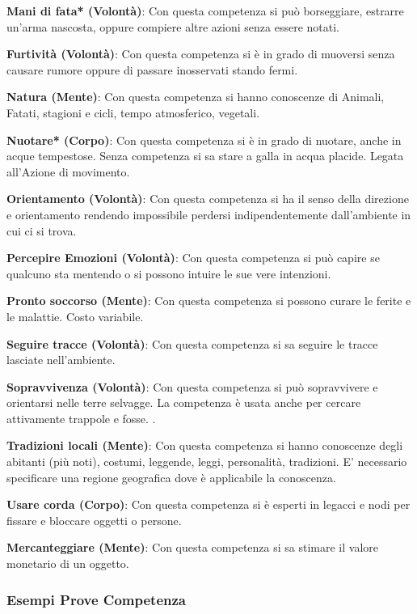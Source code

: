 \documentclass[12pt,a4paper,twoside,openany]{book}
\begin{document}
\begin{multicols}{2}
\textbf{Mani di fata* (Volontà)}: Con questa competenza si può borseggiare, estrarre un'arma nascosta, oppure compiere altre azioni senza essere notati. 

\textbf{Furtività (Volontà)}: Con questa competenza si è in grado di muoversi senza causare rumore oppure di passare inosservati stando fermi. 

\textbf{Natura (Mente)}: Con questa competenza si hanno conoscenze di Animali, Fatati, stagioni e cicli, tempo atmosferico, vegetali. 

\textbf{Nuotare* (Corpo)}: Con questa competenza si è in grado di nuotare, anche in acque tempestose. Senza competenza si sa stare a galla in acqua placide. Legata all'Azione di movimento.

\textbf{Orientamento (Volontà)}: Con questa competenza si ha il senso della direzione e orientamento rendendo impossibile perdersi indipendentemente dall'ambiente in cui ci si trova. 

\textbf{Percepire Emozioni (Volontà)}: Con questa competenza si può capire se qualcuno sta mentendo o si possono intuire le sue vere intenzioni.

\textbf{Pronto soccorso (Mente)}: Con questa competenza si possono curare le ferite e le malattie. Costo variabile.

\textbf{Seguire tracce (Volontà)}: Con questa competenza si sa seguire le tracce lasciate nell'ambiente. 

\textbf{Sopravvivenza (Volontà)}: Con questa competenza si può sopravvivere e orientarsi nelle terre selvagge. La competenza è usata anche per cercare attivamente trappole e fosse. .

\textbf{Tradizioni locali (Mente)}: Con questa competenza si hanno conoscenze degli abitanti (più noti), costumi, leggende, leggi, personalità, tradizioni. E' necessario specificare una regione geografica dove è applicabile la conoscenza. 

\textbf{Usare corda (Corpo)}: Con questa competenza si è esperti in legacci e nodi per fissare e bloccare oggetti o persone. 

\textbf{Mercanteggiare (Mente)}: Con questa competenza si sa stimare il valore monetario di un oggetto.

\subsubsection{Esempi Prove Competenza}\label{esempiprovecompetenza}\hypertarget{esempiprovecompetenze}{}


\end{multicols}
\end{document}
